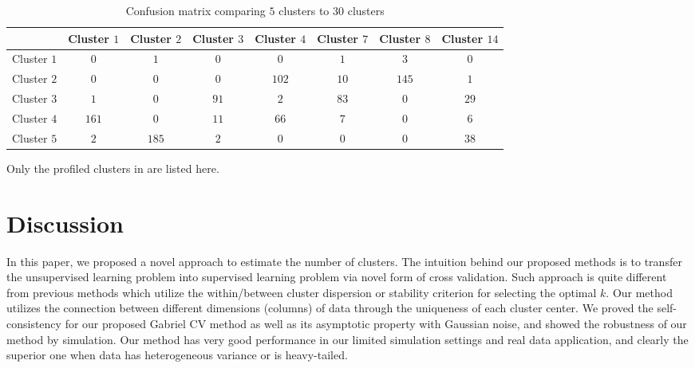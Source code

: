 \documentclass[12pt]{article}
\begin{document}
\begin{table}[t]
\begin{center}
\captionsetup{justification=centering}
\caption{\label{table:confusion} Confusion matrix comparing $5$ clusters to $30$ clusters }
\begin{threeparttable}
\begin{tabular}{lccccccc}
\hline
   &  Cluster $1$  & Cluster $2$   &  Cluster $3$  &  Cluster $4$ &  Cluster $7$  & Cluster $8$  & Cluster $14$ \\ \hline 
 Cluster $1$  & $0$  &  $1$  & $0$  &  $0$  & $1$  & $3$  & $0$ \\
 Cluster $2$  & $0$  &  $0$  & $0$  & $102$ & $10$ & $145$& $1$ \\
 Cluster $3$  & $1$  &  $0$  & $91$ &  $2$  & $83$ & $0$  & $29$ \\
 Cluster $4$  & $161$&  $0$  & $11$ &  $66$ & $7$  & $0$  & $6$ \\
 Cluster $5$  & $2$  & $185$ & $2$  &  $0$  & $0$  & $0$  & $38$ \\ \hline      
\end{tabular}
 \begin{tablenotes}
\footnotesize {Only the profiled clusters in \cite{tavazoie1999systematic} are listed here}.
  \end{tablenotes}
\end{threeparttable}
\end{center}
\end{table} 	

\section{Discussion}
\label{sec:conc}
In this paper, we proposed a novel approach to estimate the number of
clusters. The intuition behind our proposed methods is to transfer the
unsupervised learning problem into supervised learning problem via novel form
of cross validation. Such approach is quite different from previous methods which 
utilize the within/between cluster dispersion or stability criterion for selecting the 
optimal $k$. Our method utilizes the connection between different dimensions (columns)
of data through the uniqueness of each cluster center. We proved the self-consistency 
for our proposed Gabriel CV method as well as its asymptotic property with Gaussian noise,
and showed the robustness of our method by simulation. Our method has very good performance
in our limited simulation settings and real data application, and clearly the superior
one when data has heterogeneous variance or is heavy-tailed.
\end{document}
